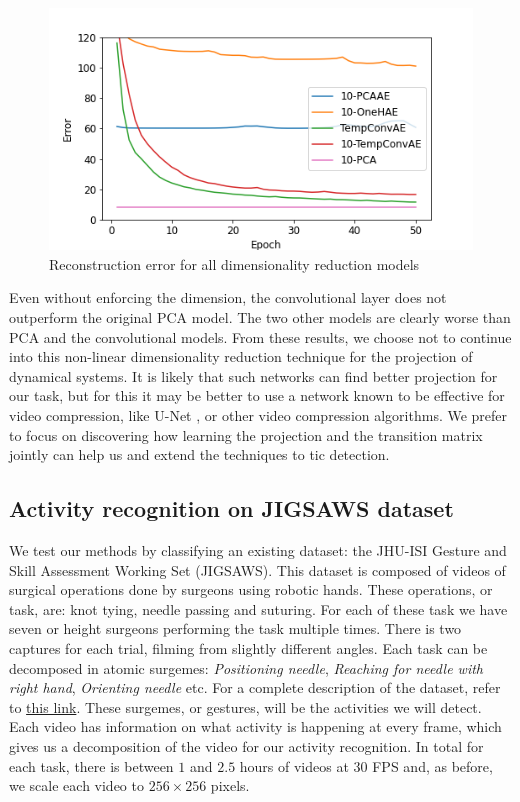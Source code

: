 \documentclass[twocolumn,10pt]{asme2ej}
\begin{document}
\begin{figure}[h]
    \centering
    \includegraphics[width=\columnwidth]{figures/reconstruction_error_comparison_pca_oneh_tempconv.png}
    \caption{Reconstruction error for all dimensionality reduction models}
    \label{fig:rec-error-all-models}
\end{figure}

Even without enforcing the dimension, the convolutional layer does not outperform the original PCA model. The two other models are clearly worse than PCA and the convolutional models. From these results, we choose not to continue into this non-linear dimensionality reduction technique for the projection of dynamical systems. It is likely that such networks can find better projection for our task, but for this it may be better to use a network known to be effective for video compression, like U-Net \cite{ronneberger2015unet}, or other video compression algorithms. We prefer to focus on discovering how learning the projection and the transition matrix jointly can help us and extend the techniques to tic detection.

\subsection{Activity recognition on JIGSAWS dataset}
We test our methods by classifying an existing dataset: the JHU-ISI Gesture and Skill Assessment Working Set (JIGSAWS). This dataset is composed of videos of surgical operations done by surgeons using robotic hands. These operations, or task, are: knot tying, needle passing and suturing. For each of these task we have seven or height surgeons performing the task multiple times. There is two captures for each trial, filming from slightly different angles. Each task can be decomposed in atomic surgemes: \textit{Positioning needle}, \textit{Reaching for needle with right hand}, \textit{Orienting needle} etc. For a complete description of the dataset, refer to \href{https://cs.jhu.edu/~los/jigsaws/dwnld/JIGSAWS.pdf}{this link}. These surgemes, or gestures, will be the activities we will detect. Each video has information on what activity is happening at every frame, which gives us a decomposition of the video for our activity recognition. In total for each task, there is between $1$ and $2.5$ hours of videos at $30$ FPS and, as before, we scale each video to $256\times 256$ pixels.
\end{document}
